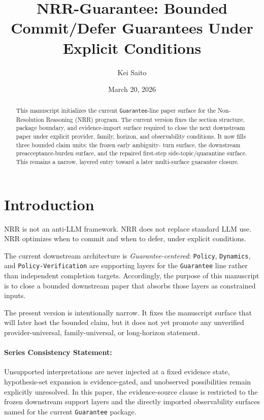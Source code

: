 \documentclass[11pt]{article}
\title{NRR-Guarantee: Bounded Commit/Defer Guarantees Under Explicit Conditions}
\author{Kei Saito}
\date{March 20, 2026}
\begin{document}
\maketitle

\begin{abstract}
This manuscript initializes the current \texttt{Guarantee}-line paper surface for
the Non-Resolution Reasoning (NRR) program. The current version fixes the section
structure, package boundary, and evidence-import surface required to close the next
downstream paper under explicit provider, family, horizon, and observability
conditions. It now fills three bounded claim units: the frozen early ambiguity-
turn surface, the downstream preacceptance-burden surface, and the repaired
first-step side-topic/quarantine surface. This remains a narrow, layered entry
toward a later multi-surface guarantee closure.
\end{abstract}

\section{Introduction}

NRR is not an anti-LLM framework. NRR does not replace standard LLM use. NRR
optimizes when to commit and when to defer, under explicit conditions.

The current downstream architecture is \textit{Guarantee-centered}: \texttt{Policy},
\texttt{Dynamics}, and \texttt{Policy-Verification} are supporting layers for the
\texttt{Guarantee} line rather than independent completion targets. Accordingly, the
purpose of this manuscript is to close a bounded downstream paper that absorbs those
layers as constrained inputs.

The present version is intentionally narrow. It fixes the manuscript surface that
will later host the bounded claim, but it does not yet promote any unverified
provider-universal, family-universal, or long-horizon statement.

\paragraph{Series Consistency Statement:}
Unsupported interpretations are never injected at a fixed evidence state,
hypothesis-set expansion is evidence-gated, and unobserved possibilities remain
explicitly unresolved. In this paper, the evidence-source clause is restricted to
the frozen downstream support layers and the directly imported observability
surfaces named for the current \texttt{Guarantee} package.
\end{document}
